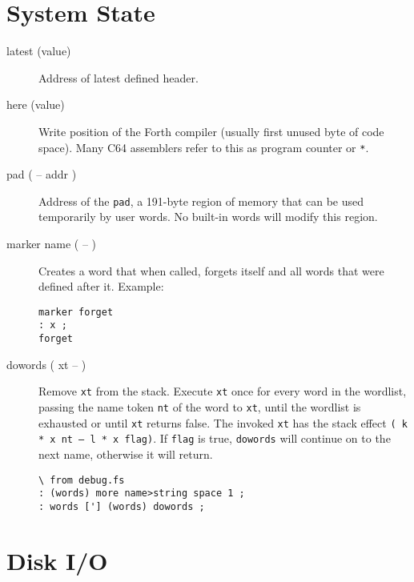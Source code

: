 \section{System State}

\begin{description}


\item[latest (value)] Address of latest defined header.

\item[here (value)] Write position of the Forth compiler (usually first unused byte of code space). Many C64 assemblers refer to this as program counter or \texttt{*}.

\item[pad ( -- addr )] Address of the \texttt{pad}, a 191-byte region of memory that can be used temporarily by user words. No built-in words will modify this region.

\item[marker name ( -- )] Creates a word that when called, forgets itself and all words that were defined after it. Example:

\begin{verbatim}
marker forget
: x ;
forget
\end{verbatim}

\item[dowords ( xt -- )] Remove \texttt{xt} from the stack. Execute \texttt{xt} once for every word in the wordlist, passing the name token \texttt{nt} of the word to \texttt{xt}, until the wordlist is exhausted or until \texttt{xt} returns false. The invoked \texttt{xt} has the stack effect \texttt{( k * x nt -- l * x flag)}. If \texttt{flag} is true, \texttt{dowords} will continue on to the next name, otherwise it will return.

\begin{verbatim}
\ from debug.fs
: (words) more name>string space 1 ;
: words ['] (words) dowords ;
\end{verbatim}
\end{description}

\section{Disk I/O}

